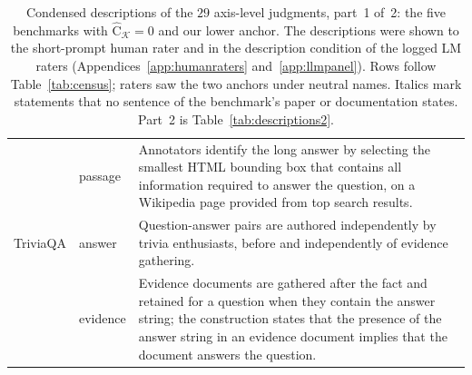 \documentclass[11pt]{article}
\newcommand{\Chat}{\widehat{\mathrm{C}}}
\newcommand{\kg}{\mathcal{K}}
\begin{document}
\begin{table}[tp]
\begin{tabular}{@{}p{}p{}p{}@{}}
 & passage & Annotators identify the long answer by selecting the smallest HTML bounding box that contains all information required to answer the question, on a Wikipedia page provided from top search results.\tabularnewline
\addlinespace[1.5pt]
\raggedright TriviaQA & answer & Question-answer pairs are authored independently by trivia enthusiasts, before and independently of evidence gathering.\tabularnewline
 & evidence & Evidence documents are gathered after the fact and retained for a question when they contain the answer string; the construction states that the presence of the answer string in an evidence document implies that the document answers the question.\tabularnewline
\bottomrule
\end{tabular}
\caption{Condensed descriptions of the $29$ axis-level judgments, part~1 of~2: the five benchmarks with $\Chat_{\kg}=0$ and our lower anchor. The descriptions were shown to the short-prompt human rater and in the description condition of the logged LM raters (Appendices~\ref{app:humanraters} and~\ref{app:llmpanel}). Rows follow Table~\ref{tab:census}; raters saw the two anchors under neutral names. Italics mark statements that no sentence of the benchmark's paper or documentation states. Part~2 is Table~\ref{tab:descriptions2}.}
\label{tab:descriptions}
\end{table}
\end{document}
